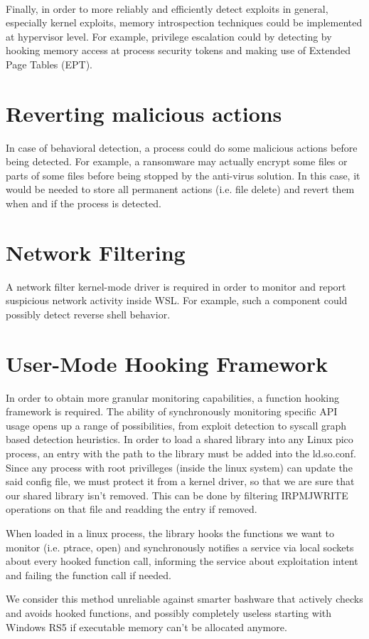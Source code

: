         \paragraph{}
        Finally, in order to more reliably and efficiently detect exploits in general, especially kernel exploits, memory introspection
        techniques could be implemented at hypervisor level. For example, privilege escalation could by detecting by hooking memory access
        at process security tokens and making use of Extended Page Tables (EPT).
        
    \section{Reverting malicious actions}
        In case of behavioral detection, a process could do some malicious actions before being detected. For example, a ransomware may actually
        encrypt some files or parts of some files before being stopped by the anti-virus solution. In this case, it would be needed to store all
        permanent actions (i.e. file delete) and revert them when and if the process is detected.

    \section{Network Filtering}
        A network filter kernel-mode driver is required in order to monitor and report suspicious network activity inside WSL. For example, such
        a component could possibly detect reverse shell behavior.

    \section{User-Mode Hooking Framework}
        In order to obtain more granular monitoring capabilities, a function hooking framework is required. The ability of synchronously monitoring
        specific API usage opens up a range of possibilities, from exploit detection to syscall graph based detection heuristics.
        In order to load a shared library into any Linux pico process, an entry with the path to the library must be added into the ld.so.conf. Since
        any process with root privilleges (inside the linux system) can update the said config file, we must protect it from a kernel driver, so that
        we are sure that our shared library isn't removed. This can be done by filtering IRP\textunderscore MJ\textunderscore WRITE operations on that
        file and readding the entry if removed.
        
        When loaded in a linux process, the library hooks the functions we want to monitor (i.e. ptrace, open) and synchronously notifies a 
        service via local sockets about every hooked function call, informing the service about exploitation intent and failing the function call
        if needed.

        We consider this method unreliable against smarter bashware that actively checks and avoids hooked functions, and possibly completely useless
        starting with Windows RS5 if executable memory can't be allocated anymore.

